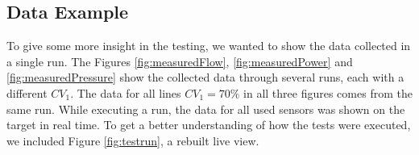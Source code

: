 \subsection{Data Example}%
To give some more insight in the testing,
we wanted to show the data collected in a single run.
The Figures \ref{fig:measuredFlow}, \ref{fig:measuredPower} and \ref{fig:measuredPressure}
show the collected data through several runs,
each with a different $CV_1$.
The data for all lines $CV_1 = 70\%$ in all three figures comes from the same run.
While executing a run,
the data for all used sensors was shown on the target in real time.
To get a better understanding of how the tests were executed,
we included Figure \ref{fig:testrun},
a rebuilt live view.


